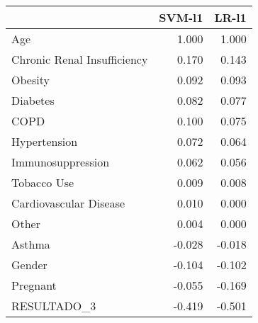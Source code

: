 \begin{tabular}{lrr}
\toprule
{} &  SVM-l1 &  LR-l1 \\
\midrule
Age                         &   1.000 &  1.000 \\
Chronic Renal Insufficiency &   0.170 &  0.143 \\
Obesity                     &   0.092 &  0.093 \\
Diabetes                    &   0.082 &  0.077 \\
COPD                        &   0.100 &  0.075 \\
Hypertension                &   0.072 &  0.064 \\
Immunosuppression           &   0.062 &  0.056 \\
Tobacco Use                 &   0.009 &  0.008 \\
Cardiovascular Disease      &   0.010 &  0.000 \\
Other                       &   0.004 &  0.000 \\
Asthma                      &  -0.028 & -0.018 \\
Gender                      &  -0.104 & -0.102 \\
Pregnant                    &  -0.055 & -0.169 \\
RESULTADO\_3                 &  -0.419 & -0.501 \\
\bottomrule
\end{tabular}

